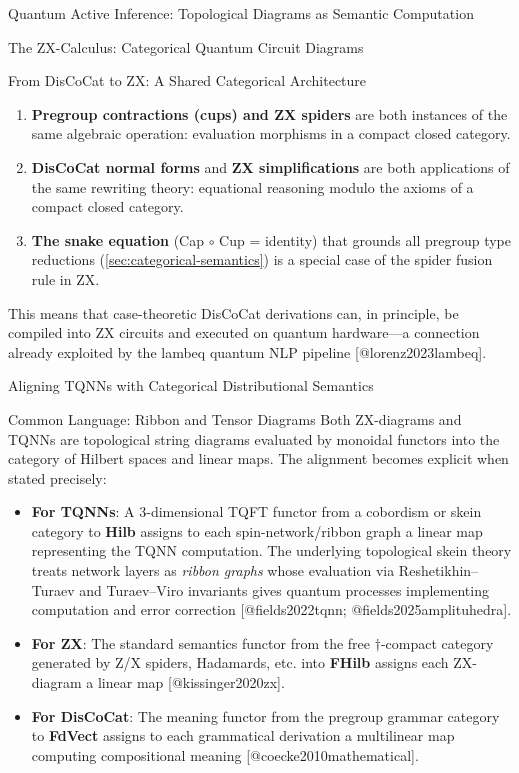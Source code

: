 \documentclass[
  ignorenonframetext,
]{beamer}
\providecommand{\tightlist}{%
  \setlength{\itemsep}{0pt}\setlength{\parskip}{0pt}}
\begin{document}
\begin{frame}{Quantum Active Inference: Topological Diagrams as Semantic
Computation}
\begin{block}{The ZX-Calculus: Categorical Quantum Circuit Diagrams}
\begin{block}{From DisCoCat to ZX: A Shared Categorical Architecture}
\begin{enumerate}
\tightlist
\item
  \textbf{Pregroup contractions (cups) and ZX spiders} are both
  instances of the same algebraic operation: evaluation morphisms in a
  compact closed category.
\item
  \textbf{DisCoCat normal forms} and \textbf{ZX simplifications} are
  both applications of the same rewriting theory: equational reasoning
  modulo the axioms of a compact closed category.
\item
  \textbf{The snake equation} (Cap \(\circ\) Cup = identity) that
  grounds all pregroup type reductions
  (\autoref{sec:categorical-semantics}) is a special case of the spider
  fusion rule in ZX.
\end{enumerate}

This means that case-theoretic DisCoCat derivations can, in principle,
be compiled into ZX circuits and executed on quantum hardware---a
connection already exploited by the lambeq quantum NLP pipeline
{[}@lorenz2023lambeq{]}.
\end{block}
\end{block}

\begin{block}{Aligning TQNNs with Categorical Distributional Semantics}
\protect{}\label{aligning-tqnns-with-categorical-distributional-semantics}
\begin{block}{Common Language: Ribbon and Tensor Diagrams}
\protect{}\label{common-language-ribbon-and-tensor-diagrams}
Both ZX-diagrams and TQNNs are topological string diagrams evaluated by
monoidal functors into the category of Hilbert spaces and linear maps.
The alignment becomes explicit when stated precisely:

\begin{itemize}
\tightlist
\item
  \textbf{For TQNNs}: A 3-dimensional TQFT functor from a cobordism or
  skein category to \textbf{Hilb} assigns to each spin-network/ribbon
  graph a linear map representing the TQNN computation. The underlying
  topological skein theory treats network layers as \emph{ribbon graphs}
  whose evaluation via Reshetikhin--Turaev and Turaev--Viro invariants
  gives quantum processes implementing computation and error correction
  {[}@fields2022tqnn; @fields2025amplituhedra{]}.
\item
  \textbf{For ZX}: The standard semantics functor from the free
  \(\dagger\)-compact category generated by Z/X spiders, Hadamards, etc.
  into \textbf{FHilb} assigns each ZX-diagram a linear map
  {[}@kissinger2020zx{]}.
\item
  \textbf{For DisCoCat}: The meaning functor from the pregroup grammar
  category to \textbf{FdVect} assigns to each grammatical derivation a
  multilinear map computing compositional meaning
  {[}@coecke2010mathematical{]}.
\end{itemize}


\end{block}
\end{block}
\end{frame}
\end{document}
